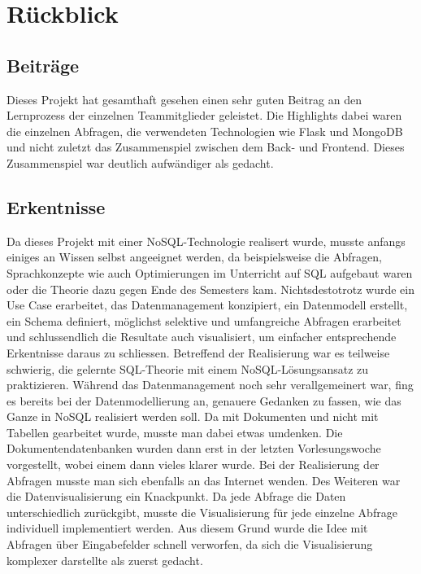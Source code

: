 \documentclass[12pt,titlepage]{article}
\begin{document}
\section{Rückblick}
\subsection{Beiträge}
Dieses Projekt hat gesamthaft gesehen einen sehr guten Beitrag an den Lernprozess der einzelnen Teammitglieder geleistet. Die Highlights dabei waren die einzelnen Abfragen, die verwendeten Technologien wie Flask und MongoDB und nicht zuletzt das Zusammenspiel zwischen dem Back- und Frontend. Dieses Zusammenspiel war deutlich aufwändiger als gedacht.

\subsection{Erkentnisse}
Da dieses Projekt mit einer NoSQL-Technologie realisert wurde, musste anfangs einiges an Wissen selbst angeeignet werden, da beispielsweise die Abfragen, Sprachkonzepte wie auch Optimierungen im Unterricht auf SQL aufgebaut waren oder die Theorie dazu gegen Ende des Semesters kam. Nichtsdestotrotz wurde ein Use Case erarbeitet, das Datenmanagement konzipiert, ein Datenmodell erstellt, ein Schema definiert, möglichst selektive und umfangreiche Abfragen erarbeitet und schlussendlich die Resultate auch visualisiert, um einfacher entsprechende Erkentnisse daraus zu schliessen. 
Betreffend der Realisierung war es teilweise schwierig, die gelernte SQL-Theorie mit einem NoSQL-Lösungsansatz zu praktizieren. Während das Datenmanagement noch sehr verallgemeinert war, fing es bereits bei der Datenmodellierung an, genauere Gedanken zu fassen, wie das Ganze in NoSQL realisiert werden soll. Da mit Dokumenten und nicht mit Tabellen gearbeitet wurde, musste man dabei etwas umdenken. Die Dokumentendatenbanken wurden dann erst in der letzten Vorlesungswoche vorgestellt, wobei einem dann vieles klarer wurde. Bei der Realisierung der Abfragen musste man sich ebenfalls an das Internet wenden. Des Weiteren war die Datenvisualisierung ein Knackpunkt. Da jede Abfrage die Daten unterschiedlich zurückgibt, musste die Visualisierung für jede einzelne Abfrage individuell implementiert werden. Aus diesem Grund wurde die Idee mit Abfragen über Eingabefelder schnell verworfen, da sich die Visualisierung komplexer darstellte als zuerst gedacht.
\end{document}

